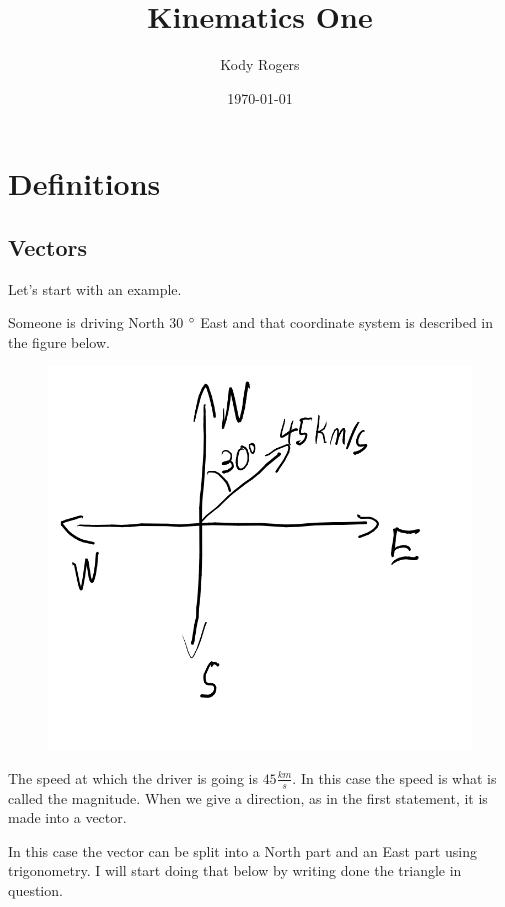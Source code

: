 \documentclass[12pt]{article}
\title{Kinematics One}
\author{Kody Rogers}
\date{\today}
\begin{document}
\maketitle
\thispagestyle{empty}


\section{Definitions}
\subsection{Vectors}
Let's start with an example.

Someone  is driving North 30 $\degree$ East and that coordinate system is described in the figure below.

\begin{figure}[h]
\includegraphics[scale=0.25]{firstVelocityDiagram.png}
\end{figure}

The speed at which the driver is going is $45 \frac{km}{s}$. In this case the speed is what is called the magnitude. When we give a direction, as in the first statement, it is made into a vector.

In this case the vector can be split into a North part and an East part using trigonometry. I will start doing that below by writing done the triangle in question.
\end{document}
